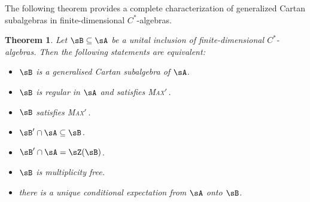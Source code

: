 \documentclass[12pt,a4paper]{amsart}
\theoremstyle{plain}
\newtheorem{theorem}{Theorem}[section]
\theoremstyle{definition}
\theoremstyle{remark}
\numberwithin{equation}{section}
\theoremstyle{ser}
\theoremstyle{serr}
\theoremstyle{ser}
\theoremstyle{ser}
\theoremstyle{collabquestion}
\newcommand{\<}{\langle}
\renewcommand{\>}{\rangle}
\newcommand{\maxprime}{\textsc{Max}$'$\,}
\begin{document}
The following theorem provides a complete characterization of generalized Cartan subalgebras in finite-dimensional $C^*$-algebras.
\begin{theorem}\label{thm:char_gen_cartan}
    Let $\sB \subseteq \sA$ be a unital inclusion of finite-dimensional $C^*$-algebras. Then the following statements are equivalent:
    \begin{itemize}
        \item[(i)] $\sB$ is a generalised Cartan subalgebra of $\sA$.
        \item[(ii)] $\sB$ is regular in $\sA$ and satisfies \maxprime.
        \item[(iii)] $\sB$ satisfies \maxprime.
        \item[(iv)] $\sB' \cap \sA \subseteq \sB$.
        \item[(v)] $\sB' \cap \sA = \sZ(\sB)$.
        \item[(vi)] $\sB$ is multiplicity free.
        \item[(vii)] there is a unique conditional expectation from $\sA$ onto $\sB$.
    \end{itemize}
\end{theorem}
\end{document}
